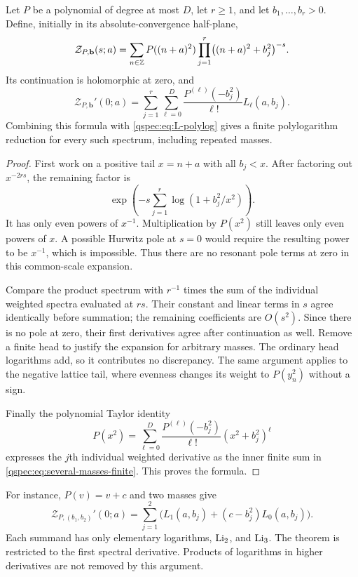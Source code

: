 \begin{theorem}
\label{qspec:thm:several-masses}
Let $P$ be a polynomial of degree at most $D$, let $r\ge1$, and let
$b_1,\ldots,b_r>0$. Define, initially in its absolute-convergence
half-plane,
\begin{equation}\label{qspec:eq:several-masses}
\mathcal Z_{P,\mathbf b}(s;a)=
\sum_{n\in\mathbb Z}P((n+a)^2)
\prod_{j=1}^r\bigl((n+a)^2+b_j^2\bigr)^{-s}.
\end{equation}
Its continuation is holomorphic at zero, and
\begin{equation}\label{qspec:eq:several-masses-finite}
\mathcal Z_{P,\mathbf b}'(0;a)
=\sum_{j=1}^r\sum_{\ell=0}^D
\frac{P^{(\ell)}(-b_j^2)}{\ell!}L_\ell(a,b_j).
\end{equation}
Combining this formula with \eqref{qspec:eq:L-polylog} gives a finite
polylogarithm reduction for every such spectrum, including repeated masses.
\end{theorem}
\begin{proof}
First work on a positive tail $x=n+a$ with all $b_j<x$. After factoring
out $x^{-2rs}$, the remaining factor is
\[
\exp\left(-s\sum_{j=1}^r\log(1+b_j^2/x^2)\right).
\]
It has only even powers of $x^{-1}$. Multiplication by $P(x^2)$ still
leaves only even powers of $x$. A possible Hurwitz pole at $s=0$
would require the resulting power to be $x^{-1}$, which is impossible.
Thus there are no resonant pole terms at zero in this common-scale
expansion.

Compare the product spectrum with $r^{-1}$ times the sum of the
individual weighted spectra evaluated at $rs$. Their constant and
linear terms in $s$ agree identically before summation; the remaining
coefficients are $O(s^2)$. Since there is no pole at zero, their first
derivatives agree after continuation as well. Remove a finite head
to justify the expansion for arbitrary masses. The ordinary head
logarithms add, so it contributes no discrepancy. The same argument
applies to the negative lattice tail, where evenness changes its
weight to $P(y_n^2)$ without a sign.

Finally the polynomial Taylor identity
\[
P(x^2)=\sum_{\ell=0}^D\frac{P^{(\ell)}(-b_j^2)}{\ell!}
 (x^2+b_j^2)^\ell
\]
expresses the $j$th individual weighted derivative as the inner finite
sum in \eqref{qspec:eq:several-masses-finite}. This proves the formula.
\end{proof}

For instance, $P(v)=v+c$ and two masses give
\[
\mathcal Z_{P,(b_1,b_2)}'(0;a)
=\sum_{j=1}^2\bigl(L_1(a,b_j)+(c-b_j^2)L_0(a,b_j)\bigr).
\]
Each summand has only elementary logarithms, $\operatorname{Li}_2$, and $\operatorname{Li}_3$.
The theorem is restricted to the first spectral derivative. Products
of logarithms in higher derivatives are not removed by this argument.

